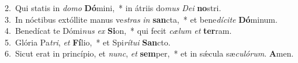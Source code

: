 {2.~}Qui statis in \textit{do}\textit{mo} \textbf{Dó}mini,~* in átriis do\textit{mus} \textit{De}\textit{i} \textbf{no}stri.\\
{3.~}In nóctibus extóllite manus ve\textit{stras} \textit{in} \textbf{san}cta,~* et bene\textit{dí}\textit{ci}\textit{te} \textbf{Dó}minum.\\
{4.~}Benedícat te Dómi\textit{nus} \textit{ex} \textbf{Si}on,~* qui fecit \textit{cæ}\textit{lum} \textit{et} \textbf{ter}ram.\\
{5.~}Glória Pa\textit{tri}, \textit{et} \textbf{Fí}lio,~* et Spi\textit{rí}\textit{tu}\textit{i} \textbf{San}cto.\\
{6.~}Sicut erat in princípio, et \textit{nunc}, \textit{et} \textbf{sem}per,~* et in sǽcula sæ\textit{cu}\textit{ló}\textit{rum}. \textbf{A}men.\\
